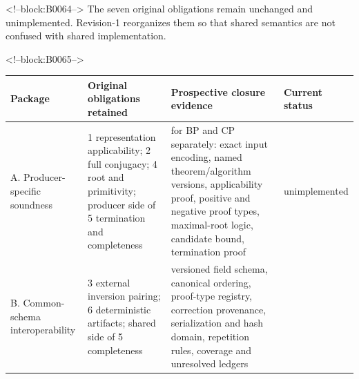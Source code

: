 \documentclass[11pt,a4paper]{article}
\begin{document}
<!--block:B0064-->
The seven original obligations remain unchanged and unimplemented. Revision-1 reorganizes them so that shared semantics are not confused with shared implementation.

<!--block:B0065-->
\begin{longtable}[]{@{}llll@{}}
\toprule
\begin{minipage}[b]{0.22\columnwidth}\raggedright
Package\strut
\end{minipage} & \begin{minipage}[b]{0.22\columnwidth}\raggedright
Original obligations retained\strut
\end{minipage} & \begin{minipage}[b]{0.22\columnwidth}\raggedright
Prospective closure evidence\strut
\end{minipage} & \begin{minipage}[b]{0.22\columnwidth}\raggedright
Current status\strut
\end{minipage}\tabularnewline
\midrule
\endhead
\begin{minipage}[t]{0.22\columnwidth}\raggedright
A. Producer-specific soundness\strut
\end{minipage} & \begin{minipage}[t]{0.22\columnwidth}\raggedright
1 representation applicability; 2 full conjugacy; 4 root and primitivity; producer side of 5 termination and completeness\strut
\end{minipage} & \begin{minipage}[t]{0.22\columnwidth}\raggedright
for BP and CP separately: exact input encoding, named theorem/algorithm versions, applicability proof, positive and negative proof types, maximal-root logic, candidate bound, termination proof\strut
\end{minipage} & \begin{minipage}[t]{0.22\columnwidth}\raggedright
unimplemented\strut
\end{minipage}\tabularnewline
\begin{minipage}[t]{0.22\columnwidth}\raggedright
B. Common-schema interoperability\strut
\end{minipage} & \begin{minipage}[t]{0.22\columnwidth}\raggedright
3 external inversion pairing; 6 deterministic artifacts; shared side of 5 completeness\strut
\end{minipage} & \begin{minipage}[t]{0.22\columnwidth}\raggedright
versioned field schema, canonical ordering, proof-type registry, correction provenance, serialization and hash domain, repetition rules, coverage and unresolved ledgers\strut

\end{minipage}
\end{longtable}
\end{document}
